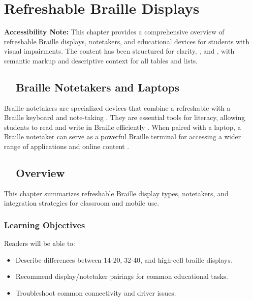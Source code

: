 \chapter{Refreshable Braille Displays}\label{ch3:braille}

\raggedright

\begin{raggedright}
	\textbf{Accessibility Note:} This chapter provides a comprehensive overview of refreshable Braille displays, notetakers, and educational devices for students with visual impairments. The content has been structured for clarity, , and , with semantic markup and descriptive context for all tables and lists.
\end{raggedright}

\section{~~Braille Notetakers and Laptops}\label{ch3:sec:notetakers-laptops}
Braille notetakers are specialized devices that combine a refreshable  with a Braille keyboard and note-taking . They are essential tools for literacy, allowing students to read and write in Braille efficiently \supercite{Holbrook2006, Presley2012, PerkinsNoteTaking, TeachingVI}. When paired with a laptop, a Braille notetaker can serve as a powerful Braille terminal for accessing a wider range of applications and online content \supercite{Kelly2011, Day2021}.

\section{~~Overview}\label{chap3:overview}
This chapter summarizes refreshable Braille display types, notetakers, and integration strategies for classroom and mobile use.

\subsection{Learning Objectives}\label{chap3:learning-objectives}
Readers will be able to:
\begin{itemize}
\item Describe differences between 14-20, 32-40, and high-cell braille displays.
\item Recommend display/notetaker pairings for common educational tasks.
\item Troubleshoot common connectivity and driver issues.
\end{itemize}

